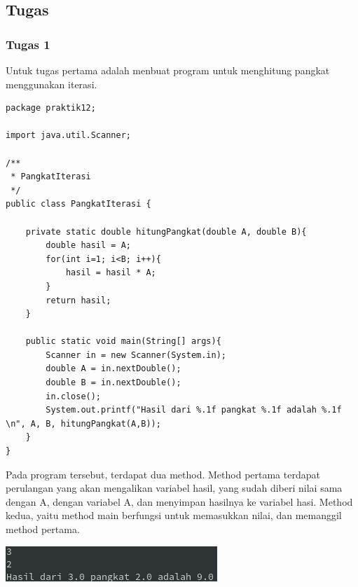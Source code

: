 \documentclass[a4paper,12pt]{article}
\begin{document}
\newpage

\subsection{Tugas}
\subsubsection{Tugas 1}
Untuk tugas pertama adalah menbuat program untuk menghitung pangkat menggunakan iterasi.

\begin{lstlisting}
package praktik12;

import java.util.Scanner;

/**
 * PangkatIterasi
 */
public class PangkatIterasi {

    private static double hitungPangkat(double A, double B){
        double hasil = A;
        for(int i=1; i<B; i++){
            hasil = hasil * A;
        }
        return hasil;
    }

    public static void main(String[] args){
        Scanner in = new Scanner(System.in);
        double A = in.nextDouble();
        double B = in.nextDouble();
        in.close();
        System.out.printf("Hasil dari %.1f pangkat %.1f adalah %.1f \n", A, B, hitungPangkat(A,B));
    }
}
\end{lstlisting}
Pada program tersebut, terdapat dua method. Method pertama terdapat perulangan yang akan mengalikan variabel hasil, yang
sudah diberi nilai sama dengan A, dengan variabel A, dan menyimpan hasilnya ke variabel hasi. Method kedua, yaitu method
main berfungsi untuk memasukkan nilai, dan memanggil method pertama.
\begin{center}
    \includegraphics[scale=1]{9.png} 
\end{center}
\end{document}
